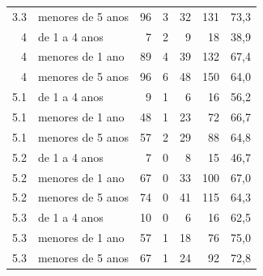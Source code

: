 \begin{apendicesenv}
{\begin{longtable}{@{}rlrrrrr@{}}
3.3 & menores de 5 anos & 96 & 3 & 32 & 131 & 73,3 \\
4 & de 1 a 4 anos & 7 & 2 & 9 & 18 & 38,9 \\
4 & menores de 1 ano & 89 & 4 & 39 & 132 & 67,4 \\
4 & menores de 5 anos & 96 & 6 & 48 & 150 & 64,0 \\
5.1 & de 1 a 4 anos & 9 & 1 & 6 & 16 & 56,2 \\
5.1 & menores de 1 ano & 48 & 1 & 23 & 72 & 66,7 \\
5.1 & menores de 5 anos & 57 & 2 & 29 & 88 & 64,8 \\
5.2 & de 1 a 4 anos & 7 & 0 & 8 & 15 & 46,7 \\
5.2 & menores de 1 ano & 67 & 0 & 33 & 100 & 67,0 \\
5.2 & menores de 5 anos & 74 & 0 & 41 & 115 & 64,3 \\
5.3 & de 1 a 4 anos & 10 & 0 & 6 & 16 & 62,5 \\
5.3 & menores de 1 ano & 57 & 1 & 18 & 76 & 75,0 \\
5.3 & menores de 5 anos & 67 & 1 & 24 & 92 & 72,8 \\
\end{longtable}}
\vspace{-6pt}



\end{apendicesenv}
